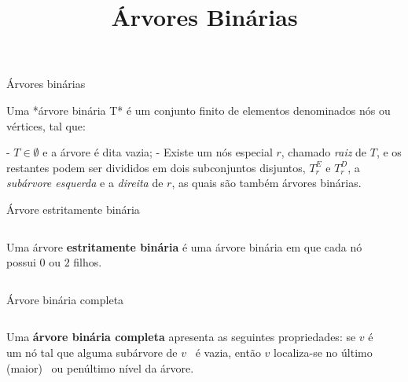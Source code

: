 \title{Árvores Binárias}

\frame{\maketitle}

\begin{frame}{Árvores binárias}

Uma *árvore binária T* é um conjunto finito de elementos
denominados nós ou vértices, tal que:

- $T\in\emptyset$ e a árvore é dita vazia;
- Existe um nós especial $r$, chamado {\it raiz\/} de $T$, e os
restantes podem ser divididos em dois subconjuntos disjuntos, $T^E_r$
e $T^D_r$, a {\it subárvore esquerda\/} e a {\it direita} de $r$, as
quais são também árvores binárias.

\end{frame}

\begin{frame}{Árvore estritamente binária}

\begin{columns}
\begin{column}{.5\textwidth}
\footnotesize
Uma árvore {\bf estritamente binária} é
uma árvore binária em que cada nó possui
$0$ ou $2$ filhos.
\end{column}

\begin{column}{.5\textwidth}
                         
\end{column}

\end{columns}

\end{frame}

\begin{frame}{Árvore binária completa}

\begin{columns}
\begin{column}{.5\textwidth}
\scriptsize
Uma {\bf árvore binária completa} apresenta
as seguintes propriedades:
se $v$ é um nó tal que alguma subárvore de $v$ \ é
vazia, então $v$ localiza-se no último (maior) \ ou penúltimo nível da
árvore.
\end{column}

\begin{column}{.5\textwidth}
   
\end{column}
\end{columns}

\end{frame}

